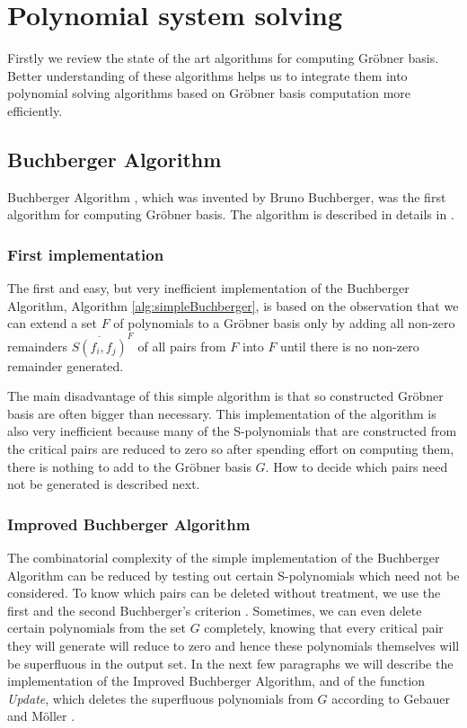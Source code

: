 \chapter{Polynomial system solving}
\label{chapter:polynomialSolving}
Firstly we review the state of the art algorithms for computing Gr\"obner basis. Better understanding of these algorithms helps us to integrate them into polynomial solving algorithms based on Gr\"obner basis computation more efficiently.

\section{Buchberger Algorithm}
Buchberger Algorithm \cite{Buchberger65}, which was invented by Bruno Buchberger, was the first algorithm for computing Gr\"obner basis. The algorithm is described in details in \cite{Becker93, Cox-Little-Shea97}.

\subsection{First implementation}
The first and easy, but very inefficient implementation of the Buchberger Algorithm, Algorithm \ref{alg:simpleBuchberger}, is based on the observation that we can extend a set $F$ of polynomials to a Gr\"obner basis only by adding all non-zero remainders $\overline{S(f_i, f_j)}^F$ of all pairs from $F$ into $F$ until there is no non-zero remainder generated.

The main disadvantage of this simple algorithm is that so constructed Gr\"obner basis are often bigger than necessary. This implementation of the algorithm is also very inefficient because many of the S-polynomials that are constructed from the critical pairs are reduced to zero so after spending effort on computing them, there is nothing to add to the Gr\"obner basis $G$. How to decide which pairs need not be generated is described next.



\subsection{Improved Buchberger Algorithm}
\label{subsec:ImprovedBuchberger}
The combinatorial complexity of the simple implementation of the Buchberger Algorithm can be reduced by testing out certain S-polynomials which need not be considered. To know which pairs can be deleted without treatment, we use the first and the second Buchberger's criterion \cite{Becker93}. Sometimes, we can even delete certain polynomials from the set $G$ completely, knowing that every critical pair they will generate will reduce to zero and hence these polynomials themselves will be superfluous in the output set. In the next few paragraphs we will describe the implementation of the Improved Buchberger Algorithm, and of the function \textit{Update}, which deletes the superfluous polynomials from $G$ according to Gebauer and M\"oller \cite{Gebauer-Moller88}.


